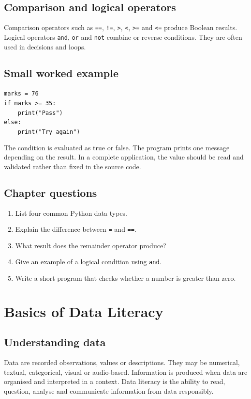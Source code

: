 \documentclass[11pt,openany,oneside]{book}
\begin{document}
\section{Comparison and logical operators}
Comparison operators such as \texttt{==}, \texttt{!=}, \texttt{>}, \texttt{<}, \texttt{>=} and \texttt{<=} produce Boolean results. Logical operators \texttt{and}, \texttt{or} and \texttt{not} combine or reverse conditions. They are often used in decisions and loops.

\section{Small worked example}
\begin{tcolorbox}[colback=SoftGray,colframe=Navy,boxrule=.5pt,arc=1mm]
\texttt{marks = 76}\\
\texttt{if marks >= 35:}\\
\texttt{\ \ \ \ print("Pass")}\\
\texttt{else:}\\
\texttt{\ \ \ \ print("Try again")}
\end{tcolorbox}
The condition is evaluated as true or false. The program prints one message depending on the result. In a complete application, the value should be read and validated rather than fixed in the source code.

\section{Chapter questions}
\begin{enumerate}
\item List four common Python data types.
\item Explain the difference between \texttt{=} and \texttt{==}.
\item What result does the remainder operator produce?
\item Give an example of a logical condition using \texttt{and}.
\item Write a short program that checks whether a number is greater than zero.
\end{enumerate}

\chapter{Basics of Data Literacy}
\section{Understanding data}
Data are recorded observations, values or descriptions. They may be numerical, textual, categorical, visual or audio-based. Information is produced when data are organised and interpreted in a context. Data literacy is the ability to read, question, analyse and communicate information from data responsibly.
\end{document}
